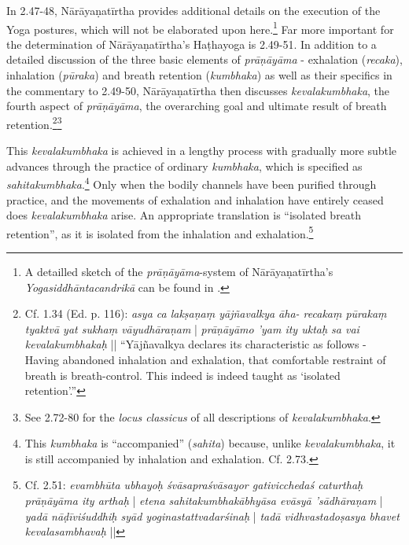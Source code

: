 In 2.47-48, Nārāyaṇatīrtha provides additional details on the execution of the Yoga postures, which will not be elaborated upon here.\footnote{A detailled sketch of the \textit{prāṇāyāma}-system of Nārāyaṇatīrtha's \textit{Yogasiddhāntacandrikā} can be found in \citeauthor[2004: 209-18]{penna2004}.} Far more important for the determination of Nārāyaṇatīrtha's Haṭhayoga is 2.49-51. In addition to a detailed discussion of the three basic elements of \textit{prāṇāyāma} - exhalation (\textit{recaka}), inhalation (\textit{pūraka}) and breath retention (\textit{kumbhaka}) as well as their specifics in the commentary to 2.49-50, Nārāyaṇatīrtha then discusses \textit{kevalakumbhaka}, the fourth aspect of \textit{prāṇāyāma}, the overarching goal and ultimate result of breath retention.\footnote{Cf.  1.34 (Ed. p. 116): \textit{asya ca lakṣaṇaṃ yājñavalkya āha- recakaṃ pūrakaṃ tyaktvā yat sukhaṃ vāyudhāraṇam} | \textit{prāṇāyāmo 'yam ity uktaḥ sa vai kevalakumbhakaḥ} || ``Yājñavalkya declares its characteristic as follows - Having abandoned inhalation and exhalation, that comfortable restraint of breath is breath-control. This indeed is indeed taught as `isolated retention'.''}\footnote{See  2.72-80 for the \textit{locus classicus} of all descriptions of \textit{kevalakumbhaka}.} 

This \textit{kevalakumbhaka} is achieved in a lengthy process with gradually more subtle advances through the practice of ordinary \textit{kumbhaka}, which is specified as \textit{sahitakumbhaka}.\footnote{This \textit{kumbhaka} is ``accompanied'' (\textit{sahita}) because, unlike \textit{kevalakumbhaka}, it is still accompanied by inhalation and exhalation. Cf.  2.73.} Only when the bodily channels have been purified through practice, and the movements of exhalation and inhalation have entirely ceased does \textit{kevalakumbhaka} arise. An appropriate translation is ``isolated breath retention'', as it is isolated from the inhalation and exhalation.\footnote{Cf.  2.51: \textit{evambhūta ubhayoḥ śvāsapraśvāsayor gativicchedaś caturthaḥ prāṇāyāma ity arthaḥ} | \textit{etena sahitakumbhakābhyāsa evāsyā 'sādhāraṇam} | \textit{yadā nāḍīviśuddhiḥ syād yoginastattvadarśinaḥ} | \textit{tadā vidhvastadoṣasya bhavet kevalasambhavaḥ} ||}

